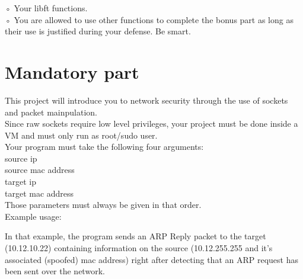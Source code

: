 \documentclass{42-en}
\begin{document}
            ◦ Your libft functions.\\    

            ◦ You are allowed to use other functions to complete the bonus part as long as their use is justified during your defense. Be smart.

\chapter{Mandatory part}

    This project will introduce you to network security through the use of sockets and packet mainpulation.\\
    Since raw sockets require low level privileges, your project must be done inside a VM and must only run as root/sudo user.\\

    Your program must take the following four arguments:\\
    source ip\\  
    source mac address\\  
    target ip\\  
    target mac address\\  

      Those parameters must always be given in that order.\\

        Example usage:
    
    In that example, the program sends an ARP Reply packet to the target (10.12.10.22) containing information on the source (10.12.255.255 and it's associated (spoofed) mac address)
    right after detecting that an ARP request has been sent over the network.\\
\end{document}

